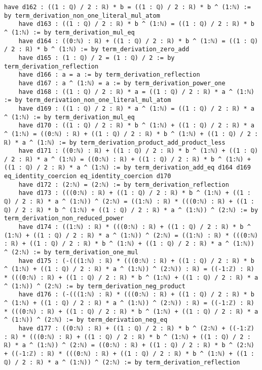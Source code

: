 \documentclass{article}
\begin{document}
\begin{tcolorbox}[colback=white!10, width=\linewidth]
\begin{lstlisting}[language=Lean4]
    have d162 : ((1 : ℚ) / 2 : ℝ) * b = ((1 : ℚ) / 2 : ℝ) * b ^ (1:ℕ) := by term_derivation_non_one_literal_mul_atom
    have d163 : ((1 : ℚ) / 2 : ℝ) * b ^ (1:ℕ) = ((1 : ℚ) / 2 : ℝ) * b ^ (1:ℕ) := by term_derivation_mul_eq
    have d164 : ((0:ℕ) : ℝ) + ((1 : ℚ) / 2 : ℝ) * b ^ (1:ℕ) = ((1 : ℚ) / 2 : ℝ) * b ^ (1:ℕ) := by term_derivation_zero_add
    have d165 : (1 : ℚ) / 2 = (1 : ℚ) / 2 := by term_derivation_reflection
    have d166 : a = a := by term_derivation_reflection
    have d167 : a ^ (1:ℕ) = a := by term_derivation_power_one
    have d168 : ((1 : ℚ) / 2 : ℝ) * a = ((1 : ℚ) / 2 : ℝ) * a ^ (1:ℕ) := by term_derivation_non_one_literal_mul_atom
    have d169 : ((1 : ℚ) / 2 : ℝ) * a ^ (1:ℕ) = ((1 : ℚ) / 2 : ℝ) * a ^ (1:ℕ) := by term_derivation_mul_eq
    have d170 : ((1 : ℚ) / 2 : ℝ) * b ^ (1:ℕ) + ((1 : ℚ) / 2 : ℝ) * a ^ (1:ℕ) = ((0:ℕ) : ℝ) + ((1 : ℚ) / 2 : ℝ) * b ^ (1:ℕ) + ((1 : ℚ) / 2 : ℝ) * a ^ (1:ℕ) := by term_derivation_product_add_product_less
    have d171 : ((0:ℕ) : ℝ) + ((1 : ℚ) / 2 : ℝ) * b ^ (1:ℕ) + ((1 : ℚ) / 2 : ℝ) * a ^ (1:ℕ) = ((0:ℕ) : ℝ) + ((1 : ℚ) / 2 : ℝ) * b ^ (1:ℕ) + ((1 : ℚ) / 2 : ℝ) * a ^ (1:ℕ) := by term_derivation_add_eq d164 d169 eq_identity_coercion eq_identity_coercion d170
    have d172 : (2:ℕ) = (2:ℕ) := by term_derivation_reflection
    have d173 : (((0:ℕ) : ℝ) + ((1 : ℚ) / 2 : ℝ) * b ^ (1:ℕ) + ((1 : ℚ) / 2 : ℝ) * a ^ (1:ℕ)) ^ (2:ℕ) = ((1:ℕ) : ℝ) * (((0:ℕ) : ℝ) + ((1 : ℚ) / 2 : ℝ) * b ^ (1:ℕ) + ((1 : ℚ) / 2 : ℝ) * a ^ (1:ℕ)) ^ (2:ℕ) := by term_derivation_non_reduced_power
    have d174 : ((1:ℕ) : ℝ) * (((0:ℕ) : ℝ) + ((1 : ℚ) / 2 : ℝ) * b ^ (1:ℕ) + ((1 : ℚ) / 2 : ℝ) * a ^ (1:ℕ)) ^ (2:ℕ) = ((1:ℕ) : ℝ) * (((0:ℕ) : ℝ) + ((1 : ℚ) / 2 : ℝ) * b ^ (1:ℕ) + ((1 : ℚ) / 2 : ℝ) * a ^ (1:ℕ)) ^ (2:ℕ) := by term_derivation_one_mul
    have d175 : (-(((1:ℕ) : ℝ) * (((0:ℕ) : ℝ) + ((1 : ℚ) / 2 : ℝ) * b ^ (1:ℕ) + ((1 : ℚ) / 2 : ℝ) * a ^ (1:ℕ)) ^ (2:ℕ)) : ℝ) = ((-1:ℤ) : ℝ) * (((0:ℕ) : ℝ) + ((1 : ℚ) / 2 : ℝ) * b ^ (1:ℕ) + ((1 : ℚ) / 2 : ℝ) * a ^ (1:ℕ)) ^ (2:ℕ) := by term_derivation_neg_product
    have d176 : (-(((1:ℕ) : ℝ) * (((0:ℕ) : ℝ) + ((1 : ℚ) / 2 : ℝ) * b ^ (1:ℕ) + ((1 : ℚ) / 2 : ℝ) * a ^ (1:ℕ)) ^ (2:ℕ)) : ℝ) = ((-1:ℤ) : ℝ) * (((0:ℕ) : ℝ) + ((1 : ℚ) / 2 : ℝ) * b ^ (1:ℕ) + ((1 : ℚ) / 2 : ℝ) * a ^ (1:ℕ)) ^ (2:ℕ) := by term_derivation_neg_eq
    have d177 : ((0:ℕ) : ℝ) + ((1 : ℚ) / 2 : ℝ) * b ^ (2:ℕ) + ((-1:ℤ) : ℝ) * (((0:ℕ) : ℝ) + ((1 : ℚ) / 2 : ℝ) * b ^ (1:ℕ) + ((1 : ℚ) / 2 : ℝ) * a ^ (1:ℕ)) ^ (2:ℕ) = ((0:ℕ) : ℝ) + ((1 : ℚ) / 2 : ℝ) * b ^ (2:ℕ) + ((-1:ℤ) : ℝ) * (((0:ℕ) : ℝ) + ((1 : ℚ) / 2 : ℝ) * b ^ (1:ℕ) + ((1 : ℚ) / 2 : ℝ) * a ^ (1:ℕ)) ^ (2:ℕ) := by term_derivation_reflection

\end{lstlisting}
\end{tcolorbox}
\end{document}

